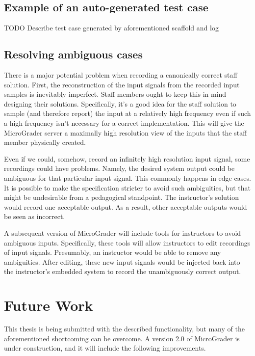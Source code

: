 \documentclass[12pt]{article}
\begin{document}
\subsection{Example of an auto-generated test case}
TODO Describe test case generated by aforementioned scaffold and log

\subsection{Resolving ambiguous cases}
There is a major potential problem when recording a canonically correct staff solution.  First, the reconstruction of the input signals from the recorded input samples is inevitably imperfect.  Staff members ought to keep this in mind designing their solutions.  Specifically, it's a good idea for the staff solution to sample (and therefore report) the input at a relatively high frequency even if such a high frequency isn't necessary for a correct implementation.  This will give the MicroGrader server a maximally high resolution view of the inputs that the staff member physically created.

Even if we could, somehow, record an infinitely high resolution input signal, some recordings could have problems.  Namely, the desired system output could be ambiguous for that particular input signal.  This commonly happens in edge cases.  It is possible to make the specification stricter to avoid such ambiguities, but that might be undesirable from a pedagogical standpoint.  The instructor's solution would record one acceptable output.  As a result, other acceptable outputs would be seen as incorrect.

A subsequent version of MicroGrader will include tools for instructors to avoid ambiguous inputs.  Specifically, these tools will allow instructors to edit recordings of input signals.  Presumably, an instructor would be able to remove any ambiguities.  After editing, these new input signals would be injected back into the instructor's embedded system to record the unambiguously correct output.


\newpage
\section{Future Work}
This thesis is being submitted with the described functionality, but many of the aforementioned shortcoming can be overcome.  A version 2.0 of MicroGrader is under construction, and it will include the following improvements.
\end{document}
